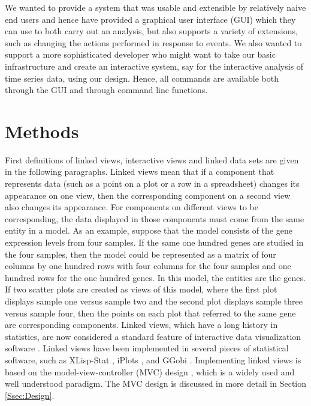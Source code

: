 \documentclass{article}[11pt]
\begin{document}
We wanted to provide a system that was usable and extensible by
relatively naive end users and hence have provided a graphical user
interface (GUI) which they can use to both carry out an analysis, but
also supports a variety of extensions, such as changing the actions
performed in response to events. We also wanted to support a more
sophisticated developer who might want to take our basic infrastructure
and create an interactive system, say for the interactive analysis of
time series data, using our design. Hence, all commands are
available both through the GUI and through command line functions.

\section{Methods}
\label{Sec:Methods}

First definitions of linked views, interactive views and linked data
sets are given in the following paragraphs.  Linked views mean that if a
component that represents data (such as a point on a plot or a row in a
spreadsheet) changes its appearance on one view, then the corresponding
component on a second view also changes its appearance.  For components on
different views to be corresponding, the data displayed in those components
must come from the same entity in a model.  As an example, suppose that the
model consists of the gene expression levels from four samples.  If the same
one hundred genes are studied in the four samples, then the model could be
represented as a matrix of four columns by one hundred rows with four columns
for the four samples and one hundred rows for the one hundred genes.  In this
model, the entities are the genes.  If two scatter plots are created as views
of this model, where the first plot displays sample one versus sample two and
the second plot displays sample three versus sample four, then the points on
each plot that referred to the same gene are corresponding components.  Linked
views, which have a long history in statistics, are now considered a standard
feature of interactive data visualization software \cite{GGobi}.  Linked views
have been implemented in several pieces of statistical software, such as
XLisp-Stat \cite{Lisp}, iPlots
\cite{iPlots}, and GGobi \cite{GGobiMan}.  Implementing linked views
is based on the model-view-controller (MVC) design \cite{DesignPatterns},
which is a widely used and well understood paradigm.  The MVC design is
discussed in more detail in Section \ref{Ssec:Design}.
\end{document}
